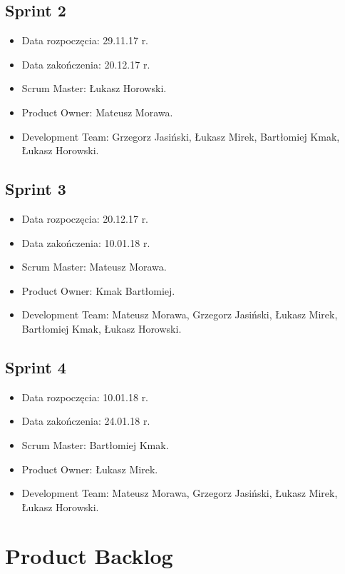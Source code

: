 \documentclass[a4paper]{article}
\begin{document}
\subsection{Sprint 2}

\begin{itemize}
\item Data rozpoczęcia: 29.11.17 r.
\item Data zakończenia: 20.12.17 r.
\item Scrum Master: Łukasz Horowski.
\item Product Owner: Mateusz Morawa.
\item Development Team: Grzegorz Jasiński, Łukasz Mirek, Bartłomiej Kmak, Łukasz Horowski.
\end{itemize}

\subsection{Sprint 3}

\begin{itemize}
\item Data rozpoczęcia: 20.12.17 r.
\item Data zakończenia: 10.01.18 r.
\item Scrum Master: Mateusz Morawa.
\item Product Owner: Kmak Bartłomiej.
\item Development Team: Mateusz Morawa, Grzegorz Jasiński, Łukasz Mirek, Bartłomiej Kmak, Łukasz Horowski.
\end{itemize}

\subsection{Sprint 4}

\begin{itemize}
\item Data rozpoczęcia: 10.01.18 r.
\item Data zakończenia: 24.01.18 r.
\item Scrum Master: Bartłomiej Kmak.
\item Product Owner: Łukasz Mirek.
\item Development Team: Mateusz Morawa, Grzegorz Jasiński, Łukasz Mirek, Łukasz Horowski.
\end{itemize}

\section{Product Backlog}
\end{document}
